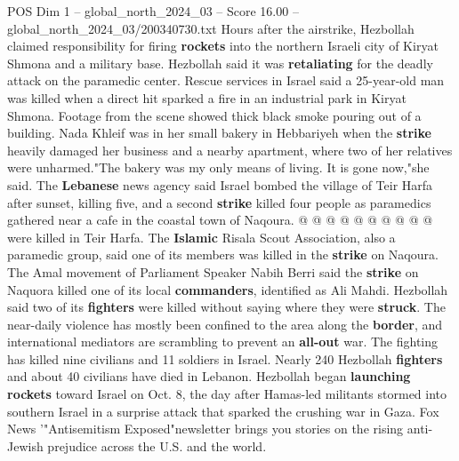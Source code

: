 \begin{textsample}{POS Dim 1 – global\_north\_2024\_03 – Score 16.00 – global\_north\_2024\_03/200340730.txt}
Hours after the airstrike, Hezbollah claimed responsibility for firing \textbf{rockets} into the northern Israeli city of Kiryat Shmona and a military base.
Hezbollah said it was \textbf{retaliating} for the deadly attack on the paramedic center.
Rescue services in Israel said a 25-year-old man was killed when a direct hit sparked a fire in an industrial park in Kiryat Shmona.
Footage from the scene showed thick black smoke pouring out of a building.
Nada Khleif was in her small bakery in Hebbariyeh when the \textbf{strike} heavily damaged her business and a nearby apartment, where two of her relatives were unharmed."The bakery was my only means of living.
It is gone now,"she said.
The \textbf{Lebanese} news agency said Israel bombed the village of Teir Harfa after sunset, killing five, and a second \textbf{strike} killed four people as paramedics gathered near a cafe in the coastal town of Naqoura. @ @ @ @ @ @ @ @ @ @ were killed in Teir Harfa.
The \textbf{Islamic} Risala Scout Association, also a paramedic group, said one of its members was killed in the \textbf{strike} on Naqoura.
The Amal movement of Parliament Speaker Nabih Berri said the \textbf{strike} on Naquora killed one of its local \textbf{commanders}, identified as Ali Mahdi.
Hezbollah said two of its \textbf{fighters} were killed without saying where they were \textbf{struck}.
The near-daily violence has mostly been confined to the area along the \textbf{border}, and international mediators are scrambling to prevent an \textbf{all-out} war.
The fighting has killed nine civilians and 11 soldiers in Israel.
Nearly 240 Hezbollah \textbf{fighters} and about 40 civilians have died in Lebanon.
Hezbollah began \textbf{launching} \textbf{rockets} toward Israel on Oct. 8, the day after Hamas-led militants stormed into southern Israel in a surprise attack that sparked the crushing war in Gaza.
Fox News '"Antisemitism Exposed"newsletter brings you stories on the rising anti-Jewish prejudice across the U.S. and the world.

\end{textsample}
